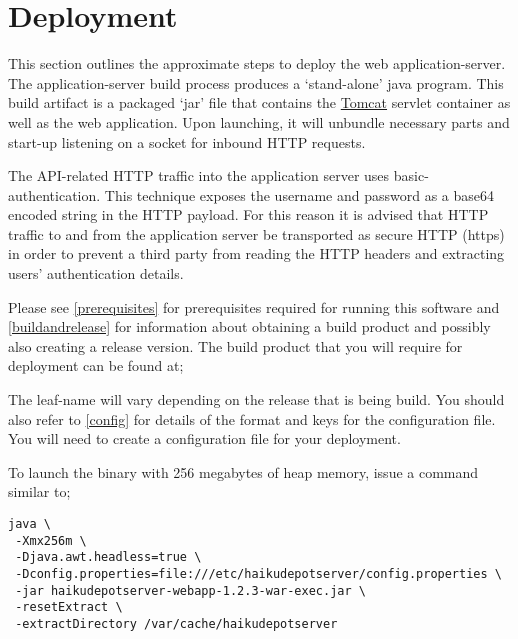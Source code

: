 
\section{Deployment}

This section outlines the approximate steps to deploy the web application-server.  The application-server build process produces a  `stand-alone' java program.  This build artifact is a packaged `jar' file that contains the \href{http://tomcat.apache.org}{Tomcat} servlet container as well as the web application.  Upon launching, it will unbundle necessary parts and start-up listening on a socket for inbound HTTP requests.


The API-related HTTP traffic into the application server uses basic-authentication.  This technique exposes the username and password as a base64 encoded string in the HTTP payload.  For this reason it is advised that HTTP traffic to and from the application server be transported as secure HTTP (https) in order to prevent a third party from reading the HTTP headers and extracting users' authentication details.

Please see \ref{prerequisites} for prerequisites required for running this software and \ref{buildandrelease} for information about obtaining a build product and possibly also creating a release version.  The build product that you will require for deployment can be found at;


The leaf-name will vary depending on the release that is being build.  You should also refer to \ref{config} for details of the format and keys for the configuration file.  You will need to create a configuration file for your deployment.

To launch the binary with 256 megabytes of heap memory, issue a command similar to;

\begin{verbatim}
java \
 -Xmx256m \
 -Djava.awt.headless=true \
 -Dconfig.properties=file:///etc/haikudepotserver/config.properties \
 -jar haikudepotserver-webapp-1.2.3-war-exec.jar \
 -resetExtract \
 -extractDirectory /var/cache/haikudepotserver
\end{verbatim}

